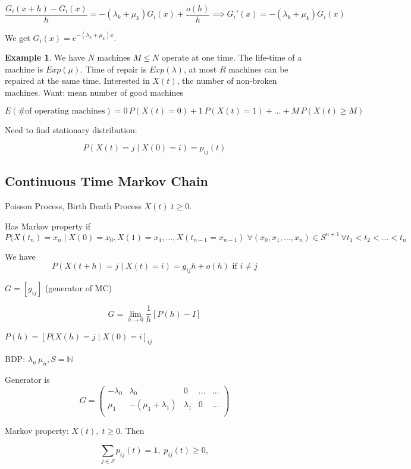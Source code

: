 \documentclass{article}
\theoremstyle{definition}
\newtheorem{exmp}{Example}[section]
\begin{document}
$$
\frac{G_i(x+h)-G_i(x)}{h} = - (\lambda_k + \mu_k) G_i(x) + \frac{o(h)}{h} \implies G_i'(x) = - (\lambda_k + \mu_k) G_i(x)
$$

We get $G_i(x) = e^{-(\lambda_k + \mu_k) x}$.

\begin{exmp}
We have $N$ machines $M \le N$ operate at one time. The life-time of a machine is $Exp(\mu)$. Time of repair is $Exp(\lambda)$, at most $R$ machines can be repaired at the same time. Interested in $X(t)$, the number of non-broken machines.
Want: mean number of good machines

$$
E(\text{\# of operating machines}) = 0 \, P(X(t) = 0) + 1 \, P(X(t) = 1) + \ldots + M \, P(X(t) \ge M )
$$

Need to find stationary distribution:

$$
P(X(t) = j \mid X(0) = i) = p_{ij}(t) 
$$

\end{exmp}

\subsection{Continuous Time Markov Chain}

Poisson Process, Birth Death Process
$X(t) \; t \ge 0$.

Has Markov property if 
$$
P(X(t_n) = x_n \mid X(0) = x_0, X(1) = x_1, \ldots, X(t_{n-1} = x_{n-1}) \; \forall (x_0, x_1, \ldots, x_n) \in S^{n+1} \, \forall t_1 < t_2 < \ldots < t_n
$$

We have
$$
P(X(t+h) = j \mid X(t) = i) = g_{ij} h + o(h) \text{ if } i \ne j
$$


$G = [g_{ij}]$ (generator of MC)

$$
G = \lim_{h \to 0} \frac{1}{h} \left[ P(h) - I \right]
$$

$P(h) = \left[ P(X(h) = j \mid X(0) = i \right]_{ij}$

BDP:
$\lambda_n \, \mu_n, S = \mathbb{N}$

Generator is 
$$
G = \begin{pmatrix}
- \lambda_0 & \lambda_0 & 0  & \ldots & \ldots \\
\mu_1 & -(\mu_1 + \lambda_1) & \lambda_1 & 0 & \ldots \\
\end{pmatrix}
$$

Markov property: $X(t), \; t \ge 0$. Then 

$$
\sum_{j \in S} p_{ij}(t) = 1, \; p_{ij}(t) \ge 0,
$$
\end{document}
